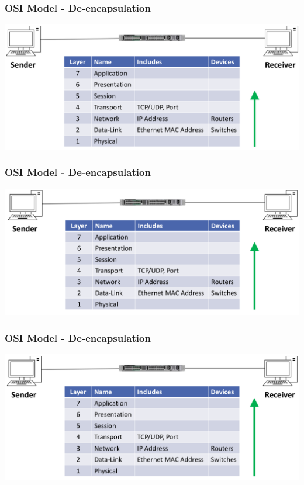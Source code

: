 \documentclass[pdflatex,compress]{beamer}
\begin{document}
\begin{frame}
	\frametitle{OSI Model - De-encapsulation}
	\begin{center}
		\includegraphics[width=\linewidth]{img/img14}
	\end{center}
\end{frame}

\begin{frame}
	\frametitle{OSI Model - De-encapsulation}
	\begin{center}
		\includegraphics[width=\linewidth]{img/img15}
	\end{center}
\end{frame}

\begin{frame}
	\frametitle{OSI Model - De-encapsulation}
	\begin{center}
		\includegraphics[width=\linewidth]{img/img16}
	\end{center}
\end{frame}
\end{document}

